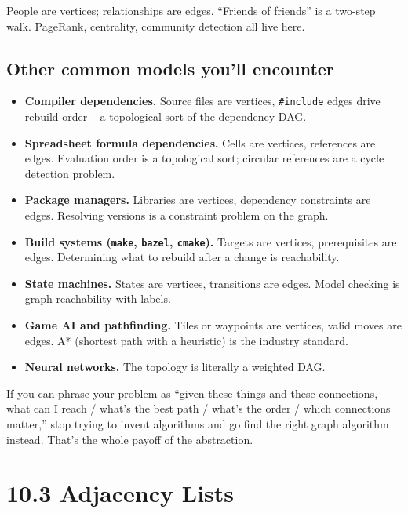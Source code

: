 \documentclass[11pt]{article}
\begin{document}
People are vertices; relationships are edges. ``Friends of friends'' is a two-step walk. PageRank, centrality, community detection all live here.

\subsection*{Other common models you'll encounter}

\begin{itemize}[leftmargin=*]
    \item \textbf{Compiler dependencies.} Source files are vertices, \texttt{\#include} edges drive rebuild order -- a topological sort of the dependency DAG.
    \item \textbf{Spreadsheet formula dependencies.} Cells are vertices, references are edges. Evaluation order is a topological sort; circular references are a cycle detection problem.
    \item \textbf{Package managers.} Libraries are vertices, dependency constraints are edges. Resolving versions is a constraint problem on the graph.
    \item \textbf{Build systems (\texttt{make}, \texttt{bazel}, \texttt{cmake}).} Targets are vertices, prerequisites are edges. Determining what to rebuild after a change is reachability.
    \item \textbf{State machines.} States are vertices, transitions are edges. Model checking is graph reachability with labels.
    \item \textbf{Game AI and pathfinding.} Tiles or waypoints are vertices, valid moves are edges. A* (shortest path with a heuristic) is the industry standard.
    \item \textbf{Neural networks.} The topology is literally a weighted DAG.
\end{itemize}

\begin{notebox}
If you can phrase your problem as ``given these things and these connections, what can I reach / what's the best path / what's the order / which connections matter,'' stop trying to invent algorithms and go find the right graph algorithm instead. That's the whole payoff of the abstraction.
\end{notebox}

\section{10.3 Adjacency Lists}
\end{document}
